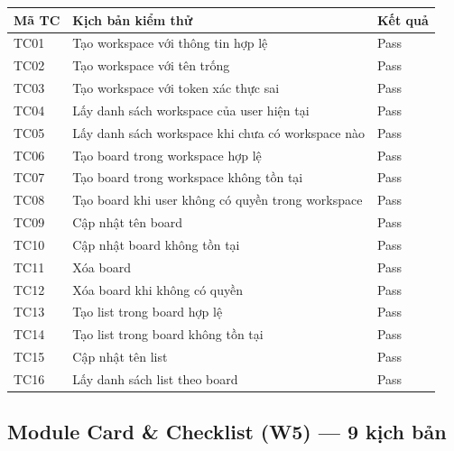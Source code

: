 \begin{table}[H]
\centering
\begin{tabularx}{\textwidth}{|l|X|l|}
\hline
\rowcolor{gray!20}
\textbf{Mã TC} & \textbf{Kịch bản kiểm thử} & \textbf{Kết quả} \\
\hline
TC01 & Tạo workspace với thông tin hợp lệ & Pass \\
\hline
TC02 & Tạo workspace với tên trống & Pass \\
\hline
TC03 & Tạo workspace với token xác thực sai & Pass \\
\hline
TC04 & Lấy danh sách workspace của user hiện tại & Pass \\
\hline
TC05 & Lấy danh sách workspace khi chưa có workspace nào & Pass \\
\hline
TC06 & Tạo board trong workspace hợp lệ & Pass \\
\hline
TC07 & Tạo board trong workspace không tồn tại & Pass \\
\hline
TC08 & Tạo board khi user không có quyền trong workspace & Pass \\
\hline
TC09 & Cập nhật tên board & Pass \\
\hline
TC10 & Cập nhật board không tồn tại & Pass \\
\hline
TC11 & Xóa board & Pass \\
\hline
TC12 & Xóa board khi không có quyền & Pass \\
\hline
TC13 & Tạo list trong board hợp lệ & Pass \\
\hline
TC14 & Tạo list trong board không tồn tại & Pass \\
\hline
TC15 & Cập nhật tên list & Pass \\
\hline
TC16 & Lấy danh sách list theo board & Pass \\
\hline
\end{tabularx}
\end{table}

\subsection*{Module Card \& Checklist (W5) — 9 kịch bản}

